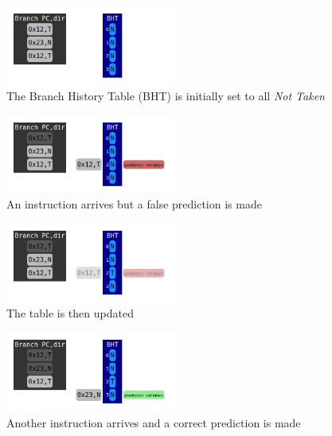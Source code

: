 \documentclass[12pt]{article}
\newenvironment{QandA}{\begin{enumerate}[label=\bfseries\alph*.]\bfseries}
                      {\end{enumerate}}
\newenvironment{answered}{\par\quad\normalfont}{}
\begin{document}
\begin{QandA}
\begin{answered}
\begin{figure}[!ht]
\centering
\includegraphics[width=0.5\textwidth]{chapter7_imgs/bbp/bbp000.png}
\caption{The Branch History Table (BHT) is initially set to all \textit{Not Taken}}
\label{bbp000}
\end{figure}

\begin{figure}[!ht]
\centering
\includegraphics[width=0.5\textwidth]{chapter7_imgs/bbp/bbp001.png}
\caption{An instruction arrives but a false prediction is made}
\label{bbp001}
\end{figure}

\begin{figure}[!ht]
\centering
\includegraphics[width=0.5\textwidth]{chapter7_imgs/bbp/bbp002.png}
\caption{The table is then updated}
\label{bbp002}
\end{figure}

\begin{figure}[!ht]
\centering
\includegraphics[width=0.5\textwidth]{chapter7_imgs/bbp/bbp003.png}
\caption{Another instruction arrives and a correct prediction is made}
\label{bbp003}
\end{figure}


\end{answered}
\end{QandA}
\end{document}
